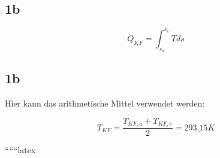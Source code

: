 

\subsection*{1b}
\[
\dot{Q}_{KF} = \int_{s_a}^{s_e} T ds
\]



\subsection*{1b}
Hier kann das arithmetische Mittel verwendet werden:

\[
\overline{T}_{KF} = \frac{T_{KF,a} + T_{KF,e}}{2} = \underline{293.15K}
\]

``````latex